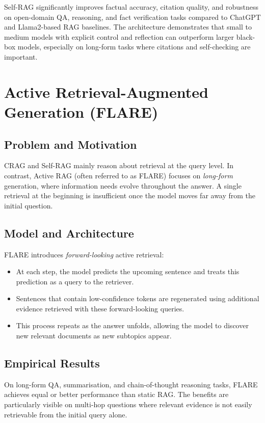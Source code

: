 \documentclass[11pt,a4paper]{article}
\begin{document}
Self-RAG significantly improves factual accuracy, citation quality, and robustness on open-domain QA, reasoning, and fact verification tasks compared to ChatGPT and Llama2-based RAG baselines. The architecture demonstrates that small to medium models with explicit control and reflection can outperform larger black-box models, especially on long-form tasks where citations and self-checking are important.

\section{Active Retrieval-Augmented Generation (FLARE)}

\subsection{Problem and Motivation}

CRAG and Self-RAG mainly reason about retrieval at the query level. In contrast, Active RAG (often referred to as FLARE) focuses on \emph{long-form} generation, where information needs evolve throughout the answer. A single retrieval at the beginning is insufficient once the model moves far away from the initial question.

\subsection{Model and Architecture}

FLARE introduces \emph{forward-looking} active retrieval:
\begin{itemize}[leftmargin=1.2cm]
  \item At each step, the model predicts the upcoming sentence and treats this prediction as a query to the retriever.
  \item Sentences that contain low-confidence tokens are regenerated using additional evidence retrieved with these forward-looking queries.
  \item This process repeats as the answer unfolds, allowing the model to discover new relevant documents as new subtopics appear.
\end{itemize}

\subsection{Empirical Results}

On long-form QA, summarisation, and chain-of-thought reasoning tasks, FLARE achieves equal or better performance than static RAG. The benefits are particularly visible on multi-hop questions where relevant evidence is not easily retrievable from the initial query alone.
\end{document}
